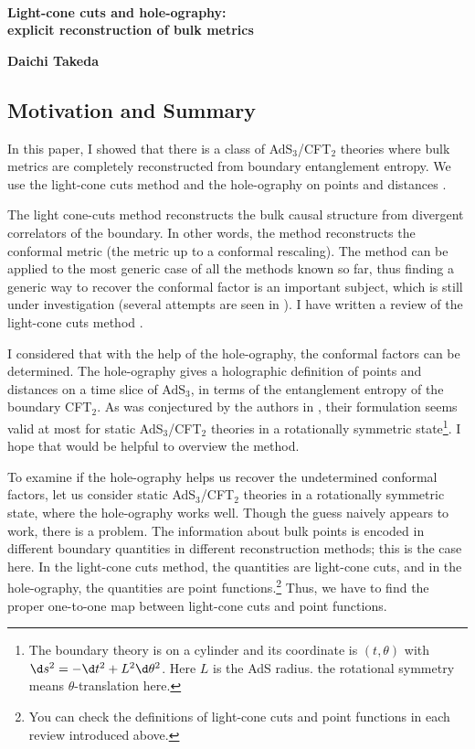 \documentclass[12pt]{article}
\date{}
\renewcommand{\thefootnote}{\fnsymbol{footnote}}
\begin{document}
{\Large{}\\[2mm]
\textbf{Light-cone cuts and hole-ography:\\explicit reconstruction of bulk metrics
\cite{Takeda:2021dsl}
}
}

\noindent
\hfill
\textbf{Daichi Takeda}%

\renewcommand{\thefootnote}{\arabic{footnote})}
\setcounter{footnote}{0}
\vspace{12pt}
\subsection*{Motivation and Summary}
In this paper, I showed that there is a class of AdS$_3$/CFT$_2$ theories where bulk metrics are completely
reconstructed from boundary entanglement entropy.
We use the light-cone cuts method \cite{Engelhardt:2016wgb} and 
the hole-ography on points and distances \cite{Czech:2014ppa}.

The light cone-cuts method reconstructs the bulk causal structure from divergent correlators of the boundary.
In other words, the method reconstructs the conformal metric (the metric up to a conformal rescaling).
The method can be applied to the most generic case of all the methods known so far,
thus finding a generic way to recover the conformal factor is an important subject,
which is still under investigation (several attempts are seen in \cite{Engelhardt:2016crc}).
I have written a review of the light-cone cuts method
\href{https://albertmcc.github.io/web/reviews/light_cone1.pdf}{\color{blue}{here}}.

I considered that with the help of the hole-ography, the conformal factors can be determined.
The hole-ography gives a holographic definition of points and distances on a time slice of AdS$_3$,
in terms of the entanglement entropy of the boundary CFT$_2$.
As was conjectured by the authors in \cite{Czech:2014ppa},
their formulation seems valid at most for static AdS$_3$/CFT$_2$ theories in a rotationally symmetric state\footnote{
The boundary theory is on a cylinder and its coordinate is $(t,\theta)$ with $\d s^2 = -\d t^2 + L^2\d\theta^2$.
Here $L$ is the AdS radius.
the rotational symmetry means $\theta$-translation here.
}.
I hope that 
\href{https://albertmcc.github.io/web/reviews/Nuts_and_Bolts_for_Creating_space.pdf}{\color{blue}{my review}}
would be helpful to overview the method.

To examine if the hole-ography helps us recover the undetermined conformal factors,
let us consider static AdS$_3$/CFT$_2$ theories in a rotationally symmetric state,
where the hole-ography works well.
Though the guess naively appears to work, there is a problem.
The information about bulk points is encoded in different boundary quantities in different reconstruction methods;
this is the case here.
In the light-cone cuts method, the quantities are light-cone cuts, and in the hole-ography,
the quantities are point functions.\footnote{
You can check the definitions of light-cone cuts and point functions in each review introduced above.
}
Thus, we have to find the proper one-to-one map between light-cone cuts and point functions.
\end{document}
